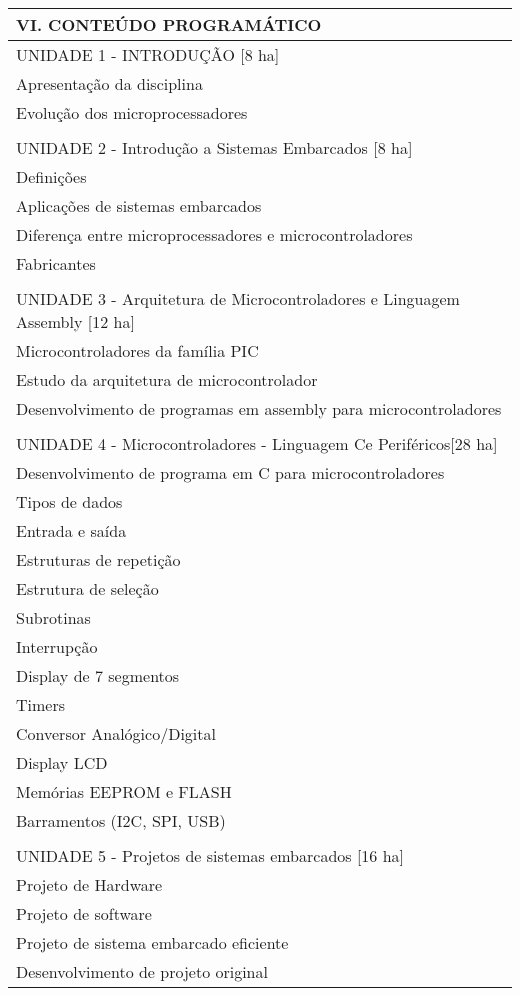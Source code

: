 \documentclass[12pt]{article}
\begin{document}
\begin{longtable}{|L{1.025\textwidth}|} \hline
%
{\bf VI. CONTEÚDO PROGRAMÁTICO } \\ \hline
UNIDADE 1 - INTRODUÇÃO [8 ha]\\
Apresentação da disciplina\\
Evolução dos microprocessadores\\
\\
UNIDADE 2 - Introdução a Sistemas Embarcados [8 ha]\\
Definições\\
Aplicações de sistemas embarcados\\
Diferença entre microprocessadores e microcontroladores\\
Fabricantes\\
\\
UNIDADE 3 - Arquitetura de Microcontroladores e  Linguagem Assembly [12 ha]\\
Microcontroladores da família PIC\\
Estudo da arquitetura de microcontrolador\\
Desenvolvimento de programas em assembly para microcontroladores\\
\\
UNIDADE 4 - Microcontroladores - Linguagem Ce Periféricos[28 ha]\\
Desenvolvimento de programa em C para microcontroladores\\
Tipos de dados\\
Entrada e saída\\ 
Estruturas de repetição\\
Estrutura de seleção\\
Subrotinas\\
Interrupção\\
Display de 7 segmentos\\
Timers\\
Conversor Analógico/Digital\\
Display LCD\\
Memórias EEPROM e FLASH\\
Barramentos (I2C, SPI, USB)\\
\\
UNIDADE 5 - Projetos de sistemas embarcados [16 ha]\\
Projeto de Hardware\\
Projeto de software\\
Projeto de sistema embarcado eficiente\\
Desenvolvimento de projeto original
\\ \hline
\end{longtable} 
\end{document}
